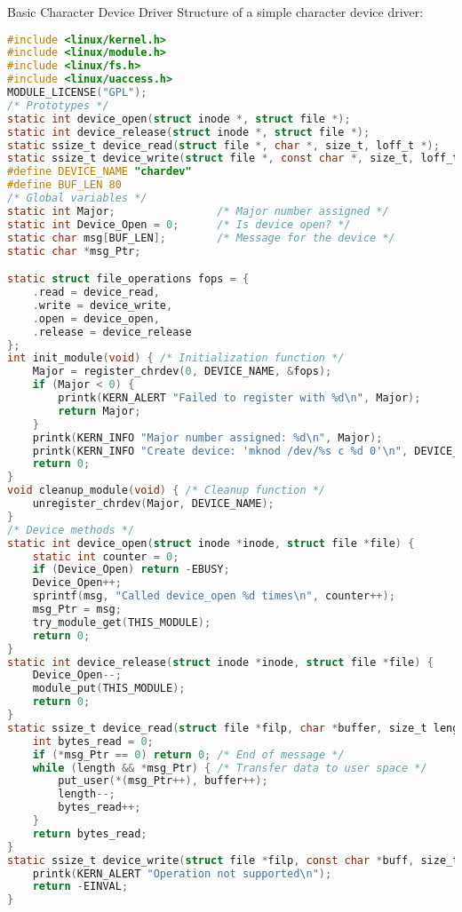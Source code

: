 \begin{code}{Basic Character Device Driver}
    Structure of a simple character device driver:
    
\begin{lstlisting}[language=C, style=basesmol]
#include <linux/kernel.h>
#include <linux/module.h>
#include <linux/fs.h>
#include <linux/uaccess.h>
MODULE_LICENSE("GPL");
/* Prototypes */
static int device_open(struct inode *, struct file *);
static int device_release(struct inode *, struct file *);
static ssize_t device_read(struct file *, char *, size_t, loff_t *);
static ssize_t device_write(struct file *, const char *, size_t, loff_t *);
#define DEVICE_NAME "chardev"
#define BUF_LEN 80
/* Global variables */
static int Major;                /* Major number assigned */
static int Device_Open = 0;      /* Is device open? */
static char msg[BUF_LEN];        /* Message for the device */
static char *msg_Ptr;

static struct file_operations fops = {
    .read = device_read,
    .write = device_write,
    .open = device_open,
    .release = device_release
};
int init_module(void) { /* Initialization function */
    Major = register_chrdev(0, DEVICE_NAME, &fops);
    if (Major < 0) {
        printk(KERN_ALERT "Failed to register with %d\n", Major);
        return Major;
    }
    printk(KERN_INFO "Major number assigned: %d\n", Major);
    printk(KERN_INFO "Create device: 'mknod /dev/%s c %d 0'\n", DEVICE_NAME, Major);
    return 0;
}
void cleanup_module(void) { /* Cleanup function */
    unregister_chrdev(Major, DEVICE_NAME);
}
/* Device methods */
static int device_open(struct inode *inode, struct file *file) {
    static int counter = 0;
    if (Device_Open) return -EBUSY;
    Device_Open++;
    sprintf(msg, "Called device_open %d times\n", counter++);
    msg_Ptr = msg;
    try_module_get(THIS_MODULE);
    return 0;
}
static int device_release(struct inode *inode, struct file *file) {
    Device_Open--;
    module_put(THIS_MODULE);
    return 0;
}
static ssize_t device_read(struct file *filp, char *buffer, size_t length, loff_t *offset) {
    int bytes_read = 0;
    if (*msg_Ptr == 0) return 0; /* End of message */
    while (length && *msg_Ptr) { /* Transfer data to user space */
        put_user(*(msg_Ptr++), buffer++);
        length--;
        bytes_read++;
    }
    return bytes_read;
}
static ssize_t device_write(struct file *filp, const char *buff, size_t len, loff_t *off) {
    printk(KERN_ALERT "Operation not supported\n");
    return -EINVAL;
}
\end{lstlisting}
\end{code}

